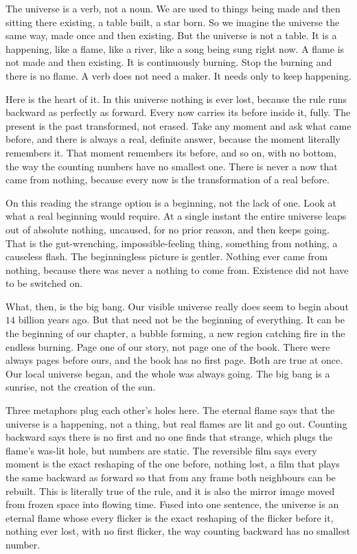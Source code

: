 The universe is a verb, not a noun. We are used to things being made and then sitting there existing, a table
built, a star born. So we imagine the universe the same way, made once and then existing. But the universe is not
a table. It is a happening, like a flame, like a river, like a song being sung right now. A flame is not made and
then existing. It is continuously burning. Stop the burning and there is no flame. A verb does not need a maker.
It needs only to keep happening.

Here is the heart of it. In this universe nothing is ever lost, because the rule runs backward as perfectly as
forward. Every now carries its before inside it, fully. The present is the past transformed, not erased. Take any
moment and ask what came before, and there is always a real, definite answer, because the moment literally
remembers it. That moment remembers its before, and so on, with no bottom, the way the counting numbers have no
smallest one. There is never a now that came from nothing, because every now is the transformation of a real
before.

On this reading the strange option is a beginning, not the lack of one. Look at what a real beginning would
require. At a single instant the entire universe leaps out of absolute nothing, uncaused, for no prior reason, and
then keeps going. That is the gut-wrenching, impossible-feeling thing, something from nothing, a causeless flash.
The beginningless picture is gentler. Nothing ever came from nothing, because there was never a nothing to come
from. Existence did not have to be switched on.

What, then, is the big bang. Our visible universe really does seem to begin about $14$ billion years ago. But that
need not be the beginning of everything. It can be the beginning of our chapter, a bubble forming, a new region
catching fire in the endless burning. Page one of our story, not page one of the book. There were always pages
before ours, and the book has no first page. Both are true at once. Our local universe began, and the whole was
always going. The big bang is a sunrise, not the creation of the sun.

Three metaphors plug each other's holes here. The eternal flame says that the universe is a happening, not a
thing, but real flames are lit and go out. Counting backward says there is no first and no one finds that strange,
which plugs the flame's was-lit hole, but numbers are static. The reversible film says every moment is the exact
reshaping of the one before, nothing lost, a film that plays the same backward as forward so that from any frame
both neighbours can be rebuilt. This is literally true of the rule, and it is also the mirror image moved from
frozen space into flowing time. Fused into one sentence, the universe is an eternal flame whose every flicker is
the exact reshaping of the flicker before it, nothing ever lost, with no first flicker, the way counting backward
has no smallest number.

